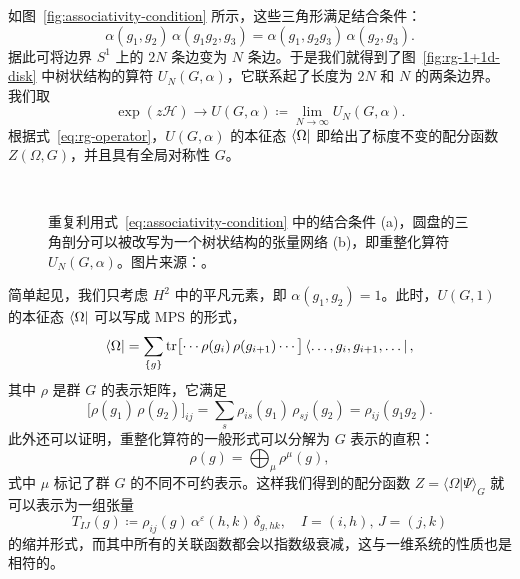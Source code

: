 如图~\ref{fig:associativity-condition} 所示，这些三角形满足结合条件：
\begin{equation}
  \alpha(g_1, g_2) \, \alpha(g_1 g_2, g_3) = \alpha(g_1, g_2 g_3) \, \alpha(g_2, g_3).
  \label{eq:associativity-condition}
\end{equation}
据此可将边界 $S^1$ 上的 $2N$ 条边变为 $N$ 条边。于是我们就得到了图~\ref{fig:rg-1+1d-disk} 中树状结构的算符 $U_N(G,\alpha)$，它联系起了长度为 $2N$ 和 $N$ 的两条边界。我们取
\begin{equation}
  \exp(z\mathcal{H}) \to U(G,\alpha) \coloneq \lim_{N\to\infty} U_N(G,\alpha).
\end{equation}
根据式~\eqref{eq:rg-operator}，$U(G,\alpha)$ 的本征态 $\bra{\Omega}$ 即给出了标度不变的配分函数 $Z(\Omega,G)$，并且具有全局对称性 $G$。

\begin{figure}[htb]
  \centering
   \\
  \caption[结合条件与树状结构的张量网络]{重复利用式~\eqref{eq:associativity-condition} 中的结合条件 (a)，圆盘的三角剖分可以被改写为一个树状结构的张量网络 (b)，即重整化算符 $U_N(G,\alpha)$。图片来源：\parencite{chen2022exact,zeng2023bulk}。}
\end{figure}

简单起见，我们只考虑 $H^2$ 中的平凡元素，即 $\alpha(g_1, g_2)=1$。此时，$U(G,1)$ 的本征态 $\bra{\Omega}$ 可以写成 MPS 的形式，
\begin{equation}
    \bra{\Omega}
  = \sum_{\{g\}} \tr\bigl[ \cdots \rho(g_i) \, \rho(g_{i+1}) \cdots \bigr]
    \bra{\dots, g_i, g_{i+1}, \dots},
\end{equation}
其中 $\rho$ 是群 $G$ 的表示矩阵，它满足
\begin{equation}
  \bigl[ \rho(g_1) \, \rho(g_2) \bigr]_{ij} = \sum_s \rho_{is}(g_1) \, \rho_{sj}(g_2) = \rho_{ij}(g_1 g_2).
\end{equation}
此外还可以证明，重整化算符的一般形式可以分解为 $G$ 表示的直积：
\begin{equation}
  \rho(g) = \bigoplus_\mu \rho^\mu(g),
\end{equation}
式中 $\mu$ 标记了群 $G$ 的不同不可约表示。这样我们得到的配分函数 $Z=\langle\Omega|\Psi\rangle_G$ 就可以表示为一组张量
\begin{equation}
  T_{IJ}(g) \coloneq \rho_{ij}(g) \, \alpha^\varepsilon(h,k) \, \delta_{g, hk}, \quad
  I = (i,h), \, J = (j,k)
\end{equation}
的缩并形式，而其中所有的关联函数都会以指数级衰减，这与一维系统的性质也是相符的。

